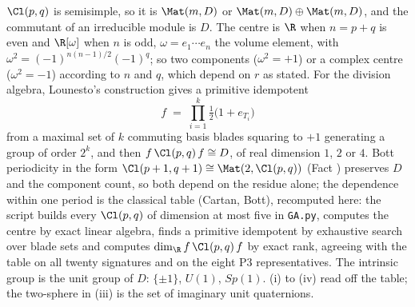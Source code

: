 $\Cl(p,q)$ is semisimple, so it is $\Mat(m, D)$ or $\Mat(m, D) \oplus \Mat(m, D)$, and the commutant of an irreducible module is $D$. The centre is $\R$ when $n = p + q$ is even and $\R[\omega]$ when $n$ is odd, $\omega = e_{1} \cdots e_{n}$ the volume element, with $\omega^{2} = (-1)^{n(n-1)/2}(-1)^{q}$; so two components ($\omega^{2} = +1$) or a complex centre ($\omega^{2} = -1$) according to $n$ and $q$, which depend on $r$ as stated. For the division algebra, Lounesto's construction gives a primitive idempotent
\[
f \;=\; \prod_{i=1}^{k}\tfrac{1}{2}\bigl(1 + e_{T_{i}}\bigr)
\]
from a maximal set of $k$ commuting basis blades squaring to $+1$ generating a group of order $2^{k}$, and then $f\,\Cl(p,q)\,f \cong D$, of real dimension $1$, $2$ or $4$. Bott periodicity in the form $\Cl(p+1, q+1) \cong \Mat(2, \Cl(p,q))$ (Fact ) preserves $D$ and the component count, so both depend on the residue alone; the dependence within one period is the classical table (Cartan, Bott), recomputed here: the script builds every $\Cl(p,q)$ of dimension at most five in \texttt{GA.py}, computes the centre by exact linear algebra, finds a primitive idempotent by exhaustive search over blade sets and computes $\dim_{\R} f\,\Cl(p,q)\,f$ by exact rank, agreeing with the table on all twenty signatures and on the eight P3 representatives. The intrinsic group is the unit group of $D$: $\{\pm 1\}$, $U(1)$, $Sp(1)$. (i) to (iv) read off the table; the two-sphere in (iii) is the set of imaginary unit quaternions.
